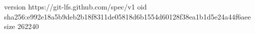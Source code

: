 version https://git-lfs.github.com/spec/v1
oid sha256:e992e18a5b9deb2b18f8311de05818d6b1554d60128f38ea1b1d5e24a44f6aee
size 262240
